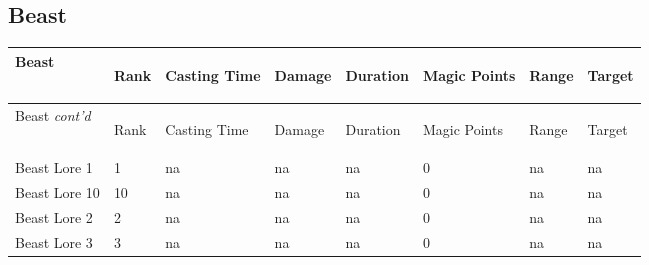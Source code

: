 \documentclass[twoside]{book}
\begin{document}
    

\subsection{Beast}
    
\begin{longtable}{p{1.25in}p{2em}p{1.5em}p{4em}p{4em}lp{4em}p{4em}} 
  Beast& \begin{turn}{70}{Rank}\end{turn}
          & \begin{turn}{70}{Casting Time}\end{turn}
          & \begin{turn}{70}{Damage}\end{turn}
          & \begin{turn}{70}{Duration}\end{turn}
          & \begin{turn}{70}{Magic Points}\end{turn}
          & \begin{turn}{70}{Range}\end{turn}
          & \begin{turn}{70}{Target}\end{turn}
          \\
  \hline
  \hline
  \endfirsthead
  Beast \textit{cont'd}
        & \begin{turn}{70}{Rank}\end{turn}
          & \begin{turn}{70}{Casting Time}\end{turn}
          & \begin{turn}{70}{Damage}\end{turn}
          & \begin{turn}{70}{Duration}\end{turn}
          & \begin{turn}{70}{Magic Points}\end{turn}
          & \begin{turn}{70}{Range}\end{turn}
          & \begin{turn}{70}{Target}\end{turn}
           \\
  \hline
  \endhead
\raggedright Beast Lore 1&1&na&na&na&0&na&na\tabularnewline
      \raggedright Beast Lore 10&10&na&na&na&0&na&na\tabularnewline
      \raggedright Beast Lore 2&2&na&na&na&0&na&na\tabularnewline
      \raggedright Beast Lore 3&3&na&na&na&0&na&na\tabularnewline

\end{longtable}
\end{document}
